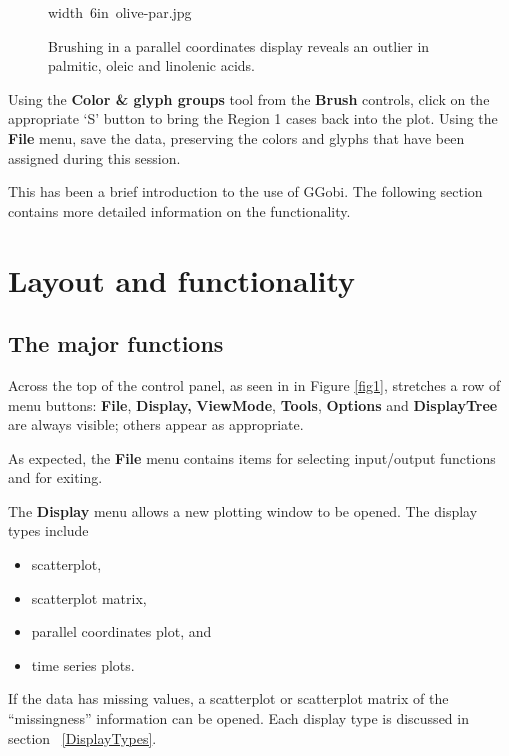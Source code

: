 \documentclass[11pt]{article}
\begin{document}
\begin{figure}[htp]
\hbox{\pdfimage width 6in {olive-par.jpg}}
\caption{Brushing in a parallel coordinates display reveals an outlier in 
palmitic, oleic and linolenic acids.}
\label{fig7}
\end{figure}

Using the {\bf Color \& glyph groups} tool from the {\bf Brush}
controls, click on the appropriate `S' button to bring the Region 1
cases back into the plot.  Using the {\bf File} menu, save the data,
preserving the colors and glyphs that have been assigned during this
session.

This has been a brief introduction to the use of GGobi. The following
section contains more detailed information on the functionality.

\section{Layout and functionality}

\subsection{The major functions}

Across the top of the control panel, as seen in in Figure \ref{fig1},
stretches a row of menu buttons:  {\bf File}, {\bf Display,} {\bf
ViewMode}, {\bf Tools}, {\bf Options} and {\bf DisplayTree} are
always visible; others appear as appropriate.

As expected, the {\bf File} menu contains items for selecting
input/output functions and for exiting.

The {\bf Display} menu allows a new plotting window to be opened. 
The display types include
\begin{itemize}
\itemsep 0em
\item scatterplot,
\item scatterplot matrix, 
\item parallel coordinates plot, and
\item time series plots.
\end{itemize}

If the data has missing values, a scatterplot or scatterplot matrix
of the ``missingness'' information can be opened.  Each display type
is discussed in section ~\ref{DisplayTypes}.
\end{document}
